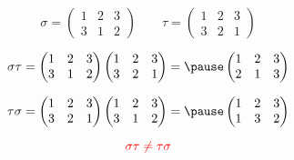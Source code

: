\begin{frame}{}
  \[
    \sigma = \begin{pmatrix}
      1 & 2 & 3 \\
      3 & 1 & 2
    \end{pmatrix} \qquad
    \tau = \begin{pmatrix}
      1 & 2 & 3 \\
      3 & 2 & 1
    \end{pmatrix}
  \]

  \pause
  \vspace{0.30cm}
  \[
    \sigma \tau = \begin{pmatrix}
      1 & 2 & 3 \\
      3 & 1 & 2
    \end{pmatrix}
    \begin{pmatrix}
      1 & 2 & 3 \\
      3 & 2 & 1
    \end{pmatrix} = \pause
    \begin{pmatrix}
      1 & 2 & 3 \\
      2 & 1 & 3
    \end{pmatrix}
  \]

  \pause
  \vspace{0.30cm}
  \[
    \tau \sigma = \begin{pmatrix}
      1 & 2 & 3 \\
      3 & 2 & 1
    \end{pmatrix}
    \begin{pmatrix}
      1 & 2 & 3 \\
      3 & 1 & 2
    \end{pmatrix} = \pause
    \begin{pmatrix}
      1 & 2 & 3 \\
      1 & 3 & 2
    \end{pmatrix}
  \]

  \pause
  \[
    \textcolor{red}{\sigma \tau \neq \tau \sigma}
  \]
\end{frame}

